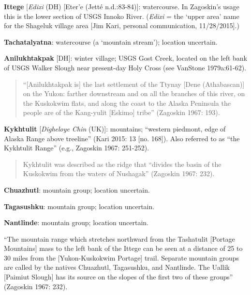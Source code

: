 \begin{hang}
\textbf{Ittege} [\textit{Edixi} (DH) [Eter’e (Jetté n.d.:83-84)]: watercourse. In Zagoskin’s usage this is the lower section of USGS Innoko River. (\textit{Edixi} = the ‘upper area’ name for the Shageluk village area [Jim Kari, personal communication, 11/28/2015].)



\textbf{Tachatalyatna}: watercourse (a ‘mountain stream’); location uncertain.



\textbf{Anilukhtakpak} [DH]: winter village; USGS Gost Creek, located on the left bank of USGS Walker Slough near present-day Holy Cross (see VanStone 1979a:61-62).



\begin{quote}“[Anilukhtakpak is] the last settlement of the Ttynay [Dene (Athabascan)] on the Yukon: farther downstream and on all the branches of this river, on the Kuskokwim flats, and along the coast to the Alaska Peninsula the people are of the Kang-yulit [Eskimo] tribe” (Zagoskin 1967: 193).
\end{quote}



\textbf{Kykhtulit} [\textit{Digheloye Chin} (UK)]: mountains; “western piedmont, edge of Alaska Range above treeline” (Kari 2015: 13 [no. 168]). Also referred to as “the Kykhtulit Range” (e.g., Zagoskin 1967: 251-252).



\begin{quote}Kykhtulit was described as the ridge that “divides the basin of the Kuskokwim from the waters of Nushagak” (Zagoskin 1967: 232).
\end{quote}



\textbf{Chuazhutl}: mountain group; location uncertain.



\textbf{Tagasushku}: mountain group; location uncertain.



\textbf{Nantlinde}: mountain group; location uncertain.



“The mountain range which stretches northward from the Tashatulit [Portage Mountains] mass to the left bank of the Ittege can be seen at a distance of 25 to 30 miles from the [Yukon-Kuskokwim Portage] trail. Separate mountain groups are called by the natives Chuazhutl, Tagasushku, and Nantlinde. The Uallik [Paimiut Slough] has its source on the slopes of the first two of these groups” (Zagoskin 1967: 232).




\end{hang}
